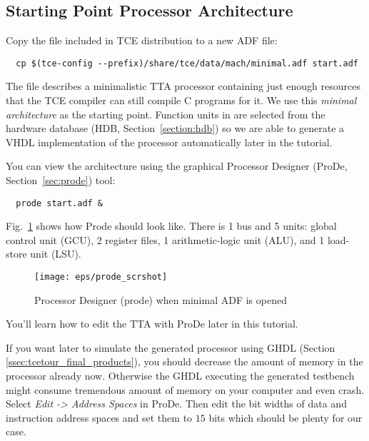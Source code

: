 \documentclass[twoside]{tceusermanual}
\begin{document}
\subsection{Starting Point Processor Architecture}
\label{ssec:start_point}


Copy the  file included in TCE distribution to a new ADF
file:

\begin{verbatim}
  cp $(tce-config --prefix)/share/tce/data/mach/minimal.adf start.adf
\end{verbatim}

The file describes a minimalistic TTA processor containing just enough
resources that the TCE compiler can still compile C programs for it.
We use this {\em minimal architecture} as the starting point.
Function units in  are selected from the hardware
database (HDB, Section~\ref{section:hdb}) so we are able to generate a VHDL
implementation of the processor automatically later in the tutorial.

You can view the architecture using the graphical Processor Designer
(ProDe, Section~\ref{sec:prode}) tool:

\begin{verbatim}
  prode start.adf &
\end{verbatim}

Fig.~\ref{fig:prode} shows how Prode should look like. There is 1 bus
and 5 units: global control unit (GCU), 2 register files, 1 arithmetic-logic
unit (ALU), and 1 load-store unit (LSU).

\begin{figure}
  \begin{center}
    \texttt{[image: eps/prode\_scrshot]}
    \caption{Processor Designer (prode) when minimal ADF is opened}
    \label{fig:prode}
  \end{center}
\end{figure}

You'll learn how to edit the TTA with ProDe later in this tutorial.

If you want later to simulate the generated processor using GHDL
(Section \ref{ssec:tcetour_final_products}), you should decrease the
amount of memory in the processor already now. Otherwise the GHDL
executing the generated testbench might consume tremendous amount of
memory on your computer and even crash. Select
\textit{Edit -> Address Spaces} in ProDe. Then edit the bit widths of
data and instruction address spaces and set them to $15$ bits which
should be plenty for our case.
\end{document}

